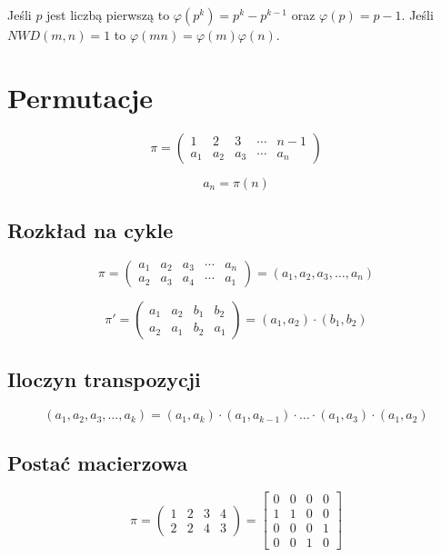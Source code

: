 \documentclass{../notatki}
\begin{document}
Jeśli $p$ jest liczbą pierwszą to $\varphi(p^k) = p^k - p^{k-1}$ oraz
$\varphi(p) = p - 1$. Jeśli $NWD(m, n) = 1$ to $\varphi(mn) =
\varphi(m)\varphi(n)$.


\section{Permutacje}

$$
\pi =
\begin{pmatrix}
  1   & 2   & 3   & \cdots & n-1   \\
  a_1 & a_2 & a_3 & \cdots &  a_n
\end{pmatrix}
$$

$$
a_n = \pi(n)
$$

\subsection{Rozkład na cykle}

$$
\pi =
\begin{pmatrix}
  a_1 & a_2 & a_3 & \cdots & a_n   \\
  a_2 & a_3 & a_4 & \cdots & a_1
\end{pmatrix}
= (a_1, a_2, a_3, \dots, a_n)
$$

$$
\pi' =
\begin{pmatrix}
  a_1 & a_2 & b_1 & b_2   \\
  a_2 & a_1 & b_2 & a_1
\end{pmatrix}
= (a_1, a_2) \cdot (b_1, b_2)
$$

\subsection{Iloczyn transpozycji}

$$
(a_1, a_2, a_3, \dots, a_k) = (a_1, a_k) \cdot (a_1, a_{k-1}) \cdot
\dots \cdot (a_1, a_3) \cdot (a_1, a_2)
$$

\subsection{Postać macierzowa}

$$
\pi =
\begin{pmatrix}
  1 & 2 & 3 & 4\\
  2 & 2 & 4 & 3
\end{pmatrix}
=
\begin{bmatrix}
  0 & 0 & 0 & 0\\
  1 & 1 & 0 & 0\\
  0 & 0 & 0 & 1\\
  0 & 0 & 1 & 0
\end{bmatrix}
$$
\end{document}
